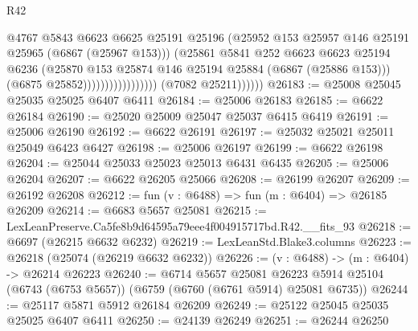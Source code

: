 \begin{lexlean}{R42}
\begin{coremodule}
{                                            @4767
                                            @5843
                                            @6623
                                            @6625
                                            @25191
                                            @25196
                                            (@25952
                                              @153
                                              @25957
                                              @146
                                              @25191
                                              @25965
                                              (@6867 (@25967 @153)))
                                            (@25861
                                              @5841
                                              @252
                                              @6623
                                              @6623
                                              @25194
                                              @6236
                                              (@25870
                                                @153
                                                @25874
                                                @146
                                                @25194
                                                @25884
                                                (@6867 (@25886 @153)))
                                              (@6875 @25852)))))))))))))))))
              (@7082 @25211))))))
@26183 := @25008 @25045 @25035 @25025 @6407 @6411
@26184 := @25006 @26183
@26185 := @6622 @26184
@26190 := @25020 @25009 @25047 @25037 @6415 @6419
@26191 := @25006 @26190
@26192 := @6622 @26191
@26197 := @25032 @25021 @25011 @25049 @6423 @6427
@26198 := @25006 @26197
@26199 := @6622 @26198
@26204 := @25044 @25033 @25023 @25013 @6431 @6435
@26205 := @25006 @26204
@26207 := @6622 @26205 @25066
@26208 := @26199 @26207
@26209 := @26192 @26208
@26212 := fun (v : @6488) => fun (m : @6404) => @26185 @26209
@26214 := @6683 @5657 @25081
@26215 := LexLeanPreserve.Ca5fe8b9d64595a79eee4f004915717bd.R42.__fits_93
@26218 := @6697 (@26215 @6632 @6232)
@26219 := LexLeanStd.Blake3.columns
@26223 := @26218 (@25074 (@26219 @6632 @6232))
@26226 := (v : @6488) -> (m : @6404) -> @26214 @26223
@26240 := @6714
    @5657
    @25081
    @26223
    @5914
    @25104
    (@6743 (@6753 @5657))
    (@6759 (@6760 (@6761 @5914) @25081 @6735))
@26244 := @25117 @5871 @5912 @26184 @26209
@26249 := @25122 @25045 @25035 @25025 @6407 @6411
@26250 := @24139 @26249
@26251 := @26244 @26250
}
\end{coremodule}
\end{lexlean}
